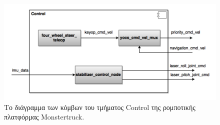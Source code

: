 \begin{figure}[!ht]
	\centering
	\includegraphics[width=0.8\linewidth]{Chapters/Chapter4/Figures/control_component_diagram.png}
	\caption{Το διάγραμμα των κόμβων του τμήματος Control της ρομποτικής πλατφόρμας Monstertruck.}
	\label{fig:control_component_diagram}
\end{figure}

